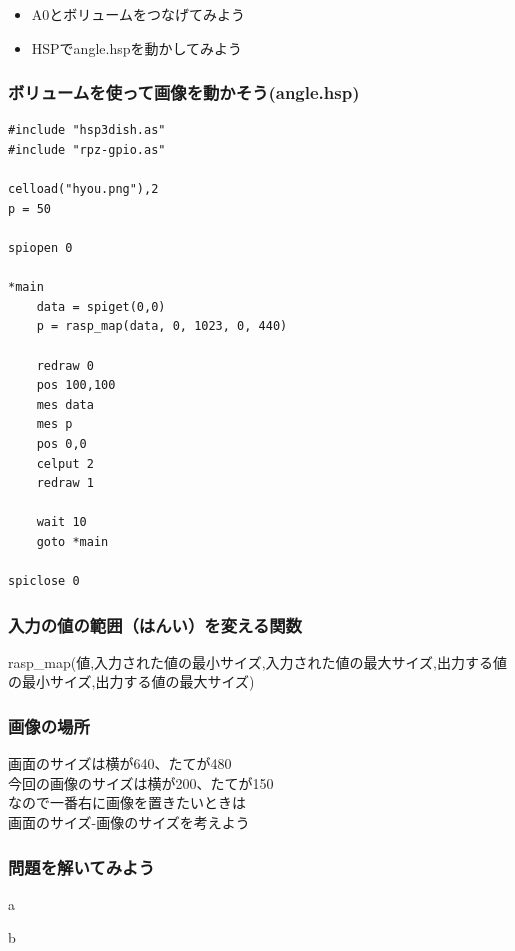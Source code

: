 \begin{frame}
\begin{center}
\begin{columns}
\begin{column}{0.48\textwidth}
            \end{column}
        \end{columns}
        \begin{itemize}
            \item A0とボリュームをつなげてみよう
            \item HSPでangle.hspを動かしてみよう
        \end{itemize}
    \end{center}
\end{frame}

\begin{frame}[fragile]
    \frametitle{ボリュームを使って画像を動かそう(angle.hsp)}
\begin{lstlisting}
#include "hsp3dish.as"
#include "rpz-gpio.as"

celload("hyou.png"),2
p = 50

spiopen 0

*main
	data = spiget(0,0)
	p = rasp_map(data, 0, 1023, 0, 440)

	redraw 0
	pos 100,100
	mes data
	mes p
	pos 0,0
	celput 2
	redraw 1

	wait 10	
	goto *main

spiclose 0
\end{lstlisting}
\end{frame}

\begin{frame}[fragile]
    \frametitle{入力の値の範囲（はんい）を変える関数}
    {rasp\_map(値,入力された値の最小サイズ,入力された値の最大サイズ,出力する値の最小サイズ,出力する値の最大サイズ)}
\end{frame}

\begin{frame}[fragile]
    \frametitle{画像の場所}
    {画面のサイズは横が640、たてが480\\
    今回の画像のサイズは横が200、たてが150\\
    なので一番右に画像を置きたいときは \\
    画面のサイズ-画像のサイズを考えよう}
\end{frame}

\begin{frame}[fragile]
    \frametitle{問題を解いてみよう}
    \begin{description}
        \item a
        \item b
    \end{description}
\end{frame}

